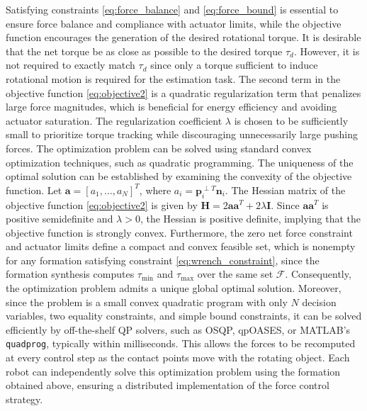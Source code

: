 Satisfying constraints \eqref{eq:force_balance} and \eqref{eq:force_bound} is essential to ensure force balance and compliance with actuator limits, while the objective function encourages the generation of the desired rotational torque. It is desirable that the net torque be as close as possible to the desired torque $\tau_d$. However, it is not required to exactly match $\tau_d$ since only a torque sufficient to induce rotational motion is required for the estimation task. The second term in the objective function \eqref{eq:objective2} is a quadratic regularization term that penalizes large force magnitudes, which is beneficial for energy efficiency and avoiding actuator saturation. The regularization coefficient $\lambda$ is chosen to be sufficiently small to prioritize torque tracking while discouraging unnecessarily large pushing forces. The optimization problem can be solved using standard convex optimization techniques, such as quadratic programming. The uniqueness of the optimal solution can be established by examining the convexity of the objective function. Let $\mathbf{a}=[a_1,\ldots,a_N]^T$, where $a_i=\mathbf{p}_i^{\perp T}\mathbf{n}_i$. The Hessian matrix of the objective function \eqref{eq:objective2} is given by $\mathbf{H}=2\mathbf{a}\mathbf{a}^T+2\lambda\mathbf{I}$. Since $\mathbf{a}\mathbf{a}^T$ is positive semidefinite and $\lambda>0$, the Hessian is positive definite, implying that the objective function is strongly convex. Furthermore, the zero net force constraint and actuator limits define a compact and convex feasible set, which is nonempty for any formation satisfying constraint \eqref{eq:wrench_constraint}, since the formation synthesis computes $\tau_{\min}$ and $\tau_{\max}$ over the same set $\mathcal{F}$. Consequently, the optimization problem admits a unique global optimal solution. Moreover, since the problem is a small convex quadratic program with only $N$ decision variables, two equality constraints, and simple bound constraints, it can be solved efficiently by off-the-shelf QP solvers, such as OSQP, qpOASES, or MATLAB's \texttt{quadprog}, typically within milliseconds. This allows the forces to be recomputed at every control step as the contact points move with the rotating object. Each robot can independently solve this optimization problem using the formation obtained above, ensuring a distributed implementation of the force control strategy.